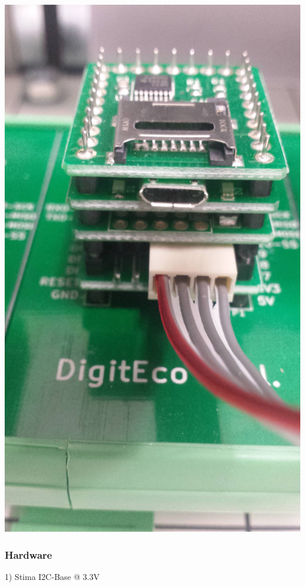 \begin{DoxyImageNoCaption}
  \mbox{\includegraphics[width=\textwidth,height=\textheight/2,keepaspectratio=true]{th.jpg}}
\end{DoxyImageNoCaption}
\hypertarget{index_stima_i2c_th_hardware}{}\subsubsection{Hardware}\label{index_stima_i2c_th_hardware}
1) Stima I2\+C-\/\+Base @ 3.\+3V

